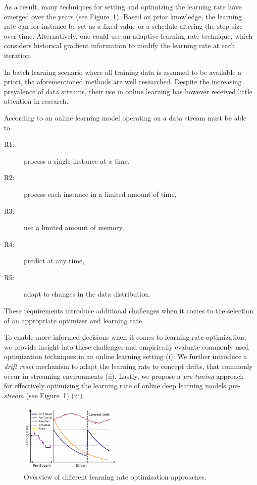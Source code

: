 \documentclass[runningheads]{llncs}
\begin{document}
As a result, many techniques for setting and optimizing the learning rate have emerged over the years (see Figure~\ref{fig:lr_overview}).
Based on prior knowledge, the learning rate can for instance be set as a fixed value or a schedule altering the step size over time.
Alternatively, one could use an adaptive learning rate technique, which considers historical gradient information to modify the learning rate at each iteration.

In batch learning scenario where all training data is assumed to be available a priori, the aforementioned methods are well researched.
Despite the increasing prevalence of data streams, their use in online learning has however received little attention in research.

According to \textcite{bifetMOAMassiveOnline2010} an online learning model operating on a data stream must be able to
\begin{center}
	\begin{description}
		\item[R1:] process a single instance at a time,\label{rq:single_instance}
		\item[R2:] process each instance in a limited amount of time,\label{rq:limited_time}
		\item[R3:] use a limited amount of memory,\label{rq:limited_memory}
		\item[R4:] predict at any time,\label{rq:predict_any_time}
		\item[R5:] adapt to changes in the data distribution.\label{rq:adapt_to_drift}
	\end{description}
\end{center}

These requirements introduce additional challenges when it comes to the selection of an appropriate optimizer and learning rate.

To enable more informed decisions when it comes to learning rate optimization, we provide insight into these challenges and empirically evaluate commonly used optimization techniques in an online learning setting (i).
We further introduce a \textit{drift reset} mechanism to adapt the learning rate to concept drifts, that commonly occur in streaming environments (ii).
Lastly, we propose a \textit{pre-tuning} approach for effectively optimizing the learning rate of online deep learning models \textit{pre-stream} (see Figure~\ref{fig:lr_overview}) (iii).

\begin{figure}
	\centering
	\includegraphics[width=0.45\textwidth]{figures/lr_overview.pdf}
	\caption{Overview of different learning rate optimization approaches.}
	\label{fig:lr_overview}
\end{figure}
\end{document}
